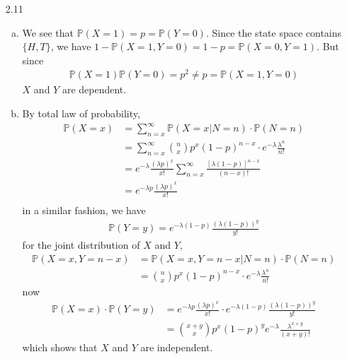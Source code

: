 \documentclass[a4paper,10pt]{article}
\theoremstyle{definition}
\begin{document}
\begin{enumerate}
\begin{enumerate}[(a)]
\end{enumerate}
\item[2.11]
\begin{enumerate}[(a)]
\item We see that $\mathbb{P}(X = 1) = p = \mathbb{P}(Y=0)$. Since the state space contains  $\{H,T\}$, we have $1 - \mathbb{P}(X =1,Y=0) = 1- p = \mathbb{P}(X = 0, Y = 1)$. But since
\begin{align*}
\mathbb{P}(X = 1)\mathbb{P}(Y=0) = p^2 \neq p = \mathbb{P}(X = 1, Y =0)
\end{align*}
$X$ and $Y$ are dependent.
\item By total law of probability, 
\begin{align*}
\mathbb{P}(X=x) &= \sum_{n = x}^{\infty} \mathbb{P}(X=x|N=n)\cdot \mathbb{P}(N=n)\\
&= \sum_{n = x}^{\infty} \binom{n}{x}p^x(1-p)^{n-x}
\cdot e^{-\lambda}\frac{\lambda^n}{n!}\\
&= e^{-\lambda}\frac{(\lambda p)^x}{x!}\sum_{n = x}^{\infty} \frac{[\lambda(1-p)]^{n-x}}{(n-x)!}\\
&= e^{-\lambda p}\frac{(\lambda p)^x}{x!}\\
\end{align*}
in a similar fashion, we have
\begin{align*}
\mathbb{P}(Y=y) = e^{-\lambda (1-p)}\frac{(\lambda (1-p))^y}{y!}
\end{align*}
for the joint distribution of $X$ and $Y$, 
\begin{align*}
\mathbb{P}(X=x, Y=n-x) &= \mathbb{P}(X=x, Y=n-x| N=n)\cdot \mathbb{P}(N=n)\\
&=\binom{n}{x}p^x(1-p)^{n-x}\cdot e^{-\lambda}\frac{\lambda^n}{n!}
\end{align*}
now
\begin{align*}
\mathbb{P}(X=x)\cdot\mathbb{P}(Y=y) &= e^{-\lambda p}\frac{(\lambda p)^x}{x!} \cdot e^{-\lambda (1-p)}\frac{(\lambda (1-p))^y}{y!}\\
&=\binom{x+y}{x} p^x(1-p)^y e^{-\lambda}\frac{\lambda^{x+y}}{(x+y)!}
\end{align*}
which shows that $X$ and $Y$ are independent.
\end{enumerate}


\end{enumerate}
\end{document}
